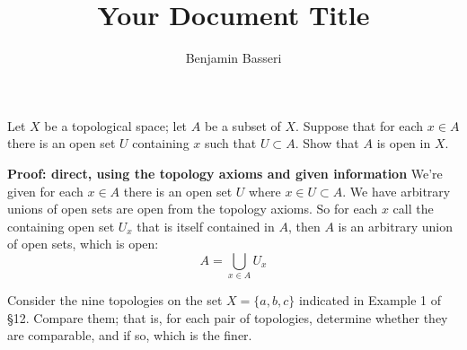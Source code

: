 \documentclass{article}
\title{Your Document Title}
\author{Benjamin Basseri}
\begin{document}
\maketitle


\begin{problem}
Let $X$ be a topological space; let $A$ be a subset of $X$. Suppose that for each $x \in A $ there is an open set $U$ containing $x$ such that $U \subset A$. Show that $A$ is open in $X$.
\end{problem}

\textbf{Proof: direct, using the topology axioms and given information}
We're given for each $x \in A$ there is an open set $U$ where $x \in U \subset A$. We have arbitrary unions of open sets are open from the topology axioms. So for each $x$ call the containing open set $U_x$ that is itself contained in $A$, then $A$ is an arbitrary union of open sets, which is open:
$$A = \bigcup_{x \in A} U_x$$

\begin{problem}
Consider the nine topologies on the set $X = \{a, b, c\}$ indicated in Example 1 of \S 12. Compare them; that is, for each pair of topologies, determine whether they are comparable, and if so, which is the finer.
\end{problem}
\end{document}
